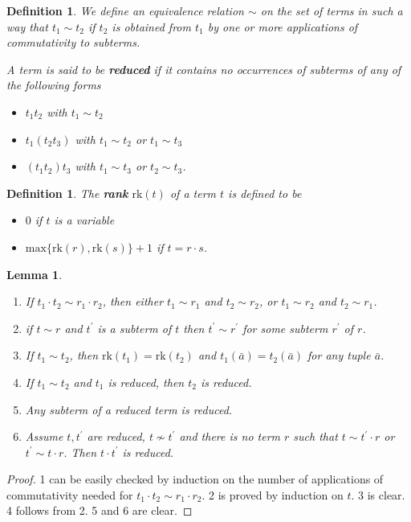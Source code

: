 \documentclass[a4paper, 11pt]{article}
\newcommand{\rk}{\mathrm{rk}}
\theoremstyle{note}
\newtheorem{lemma}[thm]{Lemma}
\newtheorem{df}[thm]{Definition}
\begin{document}
	

	
	\begin{df} We define an equivalence relation $\sim$ on the set of terms in such a way that $t_1 \sim t_2$ if $t_2$ is obtained from $t_1$ by one or more applications of commutativity to subterms.
		
		A term is said to be \textbf{reduced} if it contains no occurrences of subterms of any of the following forms
		\begin{itemize} 
			\item $t_1 t_2$ with $t_1 \sim t_2$
			\item  $t_1(t_2t_3)$ with $t_1 \sim t_2$ or $t_1 \sim t_3$
			\item $(t_1t_2)t_3$ with $t_1 \sim t_3$ or $t_2 \sim t_3$.
		\end{itemize}
	\end{df}
	
	
	\begin{df} The \textbf{rank} $\rk(t)$ of a term $t$ is defined to be
		\begin{itemize}
			\item $0$ if $t$ is a variable
			\item $\mathrm{max} \{ \rk (r), \rk(s) \} + 1$ if $t = r\cdot s$.
		\end{itemize}
	\end{df}
	
	\begin{lemma}\label{May12_3}\begin{enumerate}
			\item If $t_1\cdot t_2\sim r_1\cdot r_2$, then either  $t_1\sim r_1$ and $t_2\sim r_2$,  or  $t_1\sim r_2$ and $t_2\sim r_1$.
			\item if $t\sim r$ and $t^\prime$ is a subterm of $t$ then $t^\prime\sim r^\prime$ for some subterm $r^\prime$ of $r$.
			\item If $t_1\sim t_2$, then $\rk(t_1)= \rk(t_2)$  and  $t_1(\bar{a})= t_2(\bar{a})$  for any tuple $\bar{a}$.
			\item If  $t_1\sim t_2$ and $t_1$ is reduced, then $t_2$ is reduced.
			\item Any subterm of a reduced term is reduced.
			\item Assume $t,t^\prime$ are reduced, $t\not\sim t^\prime$ and there is no term $r$ such that  $t\sim t^\prime\cdot r$ or $t^\prime\sim t\cdot r$. Then $t\cdot t^\prime$ is reduced.
		\end{enumerate}
	\end{lemma}
	\begin{proof} 1 can be easily checked by induction on the number of applications of commutativity needed for $t_1\cdot t_2\sim r_1\cdot r_2$.  2 is proved by induction on $t$.  3 is clear.  4 follows from 2. 5  and 6 are clear.
	\end{proof}
\end{document}

